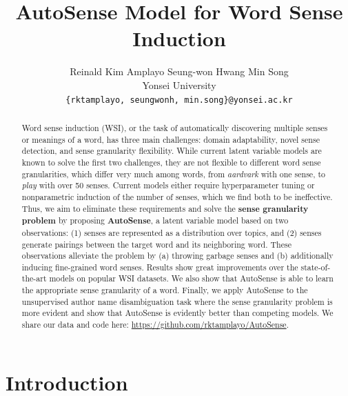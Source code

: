 \documentclass[letterpaper]{article}
\begin{document}
\title{AutoSense Model for Word Sense Induction}

\author{
    Reinald Kim Amplayo \quad Seung-won Hwang \quad Min Song\\
    Yonsei University \\
    {\tt \{rktamplayo, seungwonh, min.song\}@yonsei.ac.kr}
}

\maketitle
\begin{abstract}
 Word sense induction (WSI), or the task of automatically discovering multiple senses or meanings of a word, has three main challenges: domain adaptability, novel sense detection, and sense granularity flexibility. While current latent variable models are known to solve the first two challenges, they are not flexible to different word sense granularities, which differ very much among words, from \textit{aardvark} with one sense, to \textit{play} with over 50 senses. Current models either require hyperparameter tuning or nonparametric induction of the number of senses, which we find both to be ineffective. Thus, we aim to eliminate these requirements and solve the \textbf{sense granularity problem} by proposing \textbf{AutoSense}, a latent variable model based on two observations: (1) senses are represented as a distribution over topics, and (2) senses generate pairings between the target word and its neighboring word. These observations alleviate the problem by (a) throwing garbage senses and (b) additionally inducing fine-grained word senses. Results show great improvements over the state-of-the-art models on popular WSI datasets. We also show that AutoSense is able to learn the appropriate sense granularity of a word. Finally, we apply AutoSense to the unsupervised author name disambiguation task where the sense granularity problem is more evident and show that AutoSense is evidently better than competing models. We share our data and code here: \url{https://github.com/rktamplayo/AutoSense}.
\end{abstract}

\setlength{\abovedisplayskip}{0pt}%
\setlength{\belowdisplayskip}{0pt}%
\setlength{\abovedisplayshortskip}{0pt}%
\setlength{\belowdisplayshortskip}{0pt}%
\setlength{\jot}{0pt}

\section{Introduction}
\end{document}
